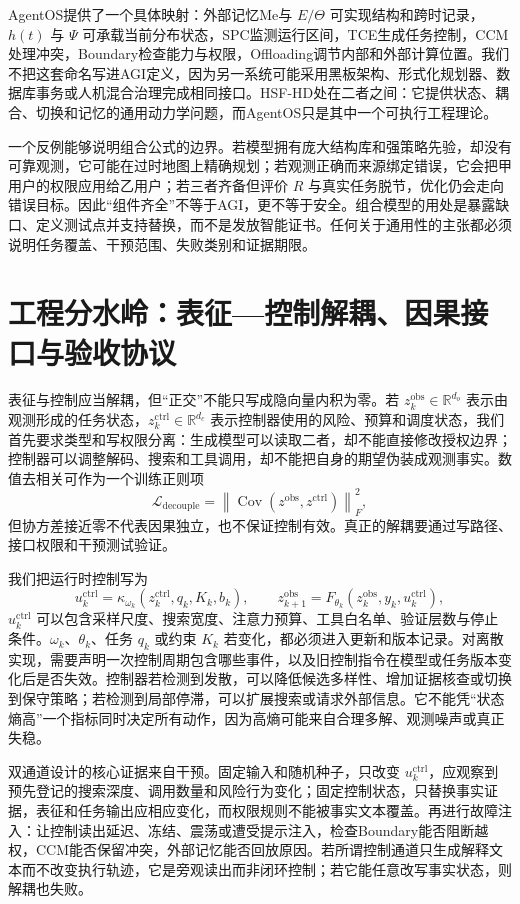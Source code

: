 AgentOS提供了一个具体映射：外部记忆Me与 $E/\Theta$ 可实现结构和跨时记录，$h(t)$ 与 $\Psi$ 可承载当前分布状态，SPC监测运行区间，TCE生成任务控制，CCM处理冲突，Boundary检查能力与权限，Offloading调节内部和外部计算位置。我们不把这套命名写进AGI定义，因为另一系统可能采用黑板架构、形式化规划器、数据库事务或人机混合治理完成相同接口。HSF-HD处在二者之间：它提供状态、耦合、切换和记忆的通用动力学问题，而AgentOS只是其中一个可执行工程理论。

一个反例能够说明组合公式的边界。若模型拥有庞大结构库和强策略先验，却没有可靠观测，它可能在过时地图上精确规划；若观测正确而来源绑定错误，它会把甲用户的权限应用给乙用户；若三者齐备但评价 $R$ 与真实任务脱节，优化仍会走向错误目标。因此“组件齐全”不等于AGI，更不等于安全。组合模型的用处是暴露缺口、定义测试点并支持替换，而不是发放智能证书。任何关于通用性的主张都必须说明任务覆盖、干预范围、失败类别和证据期限。

\section{工程分水岭：表征—控制解耦、因果接口与验收协议}
\label{sec:cpd_engineering_watershed}

表征与控制应当解耦，但“正交”不能只写成隐向量内积为零。若 $z_k^{\mathrm{obs}}\in\mathbb{R}^{d_o}$ 表示由观测形成的任务状态，$z_k^{\mathrm{ctrl}}\in\mathbb{R}^{d_c}$ 表示控制器使用的风险、预算和调度状态，我们首先要求类型和写权限分离：生成模型可以读取二者，却不能直接修改授权边界；控制器可以调整解码、搜索和工具调用，却不能把自身的期望伪装成观测事实。数值去相关可作为一个训练正则项
\[
 \mathcal{L}_{\mathrm{decouple}}
 =\left\|\operatorname{Cov}(z^{\mathrm{obs}},z^{\mathrm{ctrl}})\right\|_F^2,
\]
但协方差接近零不代表因果独立，也不保证控制有效。真正的解耦要通过写路径、接口权限和干预测试验证。

我们把运行时控制写为
\[
 u_k^{\mathrm{ctrl}}
 =\kappa_{\omega_k}
 (z_k^{\mathrm{ctrl}},q_k,K_k,b_k),
 \qquad
 z_{k+1}^{\mathrm{obs}}
 =F_{\theta_k}(z_k^{\mathrm{obs}},y_k,u_k^{\mathrm{ctrl}}),
\]
$u_k^{\mathrm{ctrl}}$ 可以包含采样尺度、搜索宽度、注意力预算、工具白名单、验证层数与停止条件。$\omega_k$、$\theta_k$、任务 $q_k$ 或约束 $K_k$ 若变化，都必须进入更新和版本记录。对离散实现，需要声明一次控制周期包含哪些事件，以及旧控制指令在模型或任务版本变化后是否失效。控制器若检测到发散，可以降低候选多样性、增加证据核查或切换到保守策略；若检测到局部停滞，可以扩展搜索或请求外部信息。它不能凭“状态熵高”一个指标同时决定所有动作，因为高熵可能来自合理多解、观测噪声或真正失稳。

双通道设计的核心证据来自干预。固定输入和随机种子，只改变 $u_k^{\mathrm{ctrl}}$，应观察到预先登记的搜索深度、调用数量和风险行为变化；固定控制状态，只替换事实证据，表征和任务输出应相应变化，而权限规则不能被事实文本覆盖。再进行故障注入：让控制读出延迟、冻结、震荡或遭受提示注入，检查Boundary能否阻断越权，CCM能否保留冲突，外部记忆能否回放原因。若所谓控制通道只生成解释文本而不改变执行轨迹，它是旁观读出而非闭环控制；若它能任意改写事实状态，则解耦也失败。

